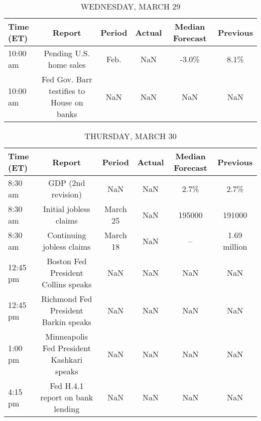 \documentclass{article}%
\begin{document}
\begin{table}[htbp]%
\caption{WEDNESDAY, MARCH 29}%
\centering%
\begin{adjustbox}{width=1\textwidth}%
\begin{tabular}{lccccc}
\toprule
Time (ET) &                                    Report & Period & Actual & Median Forecast & Previous \\
\midrule
 10:00 am &                   Pending U.S. home sales &   Feb. &    NaN &           -3.0\% &     8.1\% \\
 10:00 am & Fed Gov. Barr testifies to House on banks &    NaN &    NaN &             NaN &      NaN \\
\bottomrule
\end{tabular}
%
\end{adjustbox}%
\end{table}

%


\begin{table}[htbp]%
\caption{THURSDAY, MARCH 30}%
\centering%
\begin{adjustbox}{width=1\textwidth}%
\begin{tabular}{lccccc}
\toprule
Time (ET) &                                    Report &   Period & Actual & Median Forecast &     Previous \\
\midrule
  8:30 am &                        GDP (2nd revision) &      NaN &    NaN &            2.7\% &         2.7\% \\
  8:30 am &                    Initial jobless claims & March 25 &    NaN &          195000 &       191000 \\
  8:30 am &                 Continuing jobless claims & March 18 &    NaN &              -- & 1.69 million \\
 12:45 pm &       Boston Fed President Collins speaks &      NaN &    NaN &             NaN &          NaN \\
 12:45 pm &      Richmond Fed President Barkin speaks &      NaN &    NaN &             NaN &          NaN \\
  1:00 pm & Minneapolis Fed President Kashkari speaks &      NaN &    NaN &             NaN &          NaN \\
  4:15 pm &          Fed H.4.1 report on bank lending &      NaN &    NaN &             NaN &          NaN \\
\bottomrule
\end{tabular}
%
\end{adjustbox}%
\end{table}
\end{document}
